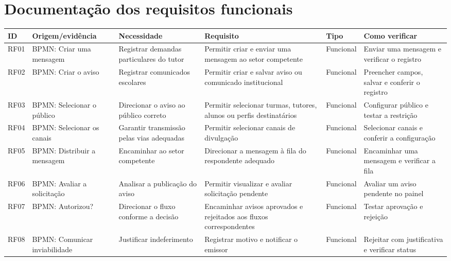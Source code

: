 \section{Documentação dos requisitos funcionais}
\begin{table}[!ht]\centering\tiny\renewcommand{\arraystretch}{1.25}
\begin{tabularx}{\linewidth}{|>{\centering\arraybackslash}p{0.75cm}|>{\raggedright\arraybackslash}p{2.4cm}|>{\raggedright\arraybackslash}X|>{\raggedright\arraybackslash}X|>{\centering\arraybackslash}p{1.15cm}|>{\raggedright\arraybackslash}X|}
\hline
\textbf{ID} & \textbf{Origem/evidência} & \textbf{Necessidade} & \textbf{Requisito} & \textbf{Tipo} & \textbf{Como verificar} \\
\hline
RF01 & BPMN: Criar uma mensagem & Registrar demandas particulares do tutor & Permitir criar e enviar uma mensagem ao setor competente & Funcional & Enviar uma mensagem e verificar o registro \\
\hline
RF02 & BPMN: Criar o aviso & Registrar comunicados escolares & Permitir criar e salvar aviso ou comunicado institucional & Funcional & Preencher campos, salvar e conferir o registro \\
\hline
RF03 & BPMN: Selecionar o público & Direcionar o aviso ao público correto & Permitir selecionar turmas, tutores, alunos ou perfis destinatários & Funcional & Configurar público e testar a restrição \\
\hline
RF04 & BPMN: Selecionar os canais & Garantir transmissão pelas vias adequadas & Permitir selecionar canais de divulgação & Funcional & Selecionar canais e conferir a configuração \\
\hline
RF05 & BPMN: Distribuir a mensagem & Encaminhar ao setor competente & Direcionar a mensagem à fila do respondente adequado & Funcional & Encaminhar uma mensagem e verificar a fila \\
\hline
RF06 & BPMN: Avaliar a solicitação & Analisar a publicação do aviso & Permitir visualizar e avaliar solicitação pendente & Funcional & Avaliar um aviso pendente no painel \\
\hline
RF07 & BPMN: Autorizou? & Direcionar o fluxo conforme a decisão & Encaminhar avisos aprovados e rejeitados aos fluxos correspondentes & Funcional & Testar aprovação e rejeição \\
\hline
RF08 & BPMN: Comunicar inviabilidade & Justificar indeferimento & Registrar motivo e notificar o emissor & Funcional & Rejeitar com justificativa e verificar status \\

\end{tabularx}
\end{table}
